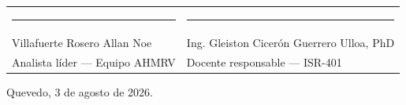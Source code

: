 \documentclass[11pt,a4paper]{article}
\begin{document}
\vspace{1.4cm}
\noindent
\begin{tabular}{p{7.0cm}p{7.0cm}}
\rule{6.4cm}{0.4pt} & \rule{6.4cm}{0.4pt} \\
Villafuerte Rosero Allan Noe & Ing. Gleiston Cicerón Guerrero Ulloa, PhD \\
Analista líder --- Equipo AHMRV & Docente responsable --- ISR-401 \\
\end{tabular}

\vspace{1.0cm}
\noindent Quevedo, 3 de agosto de 2026.
\end{document}
